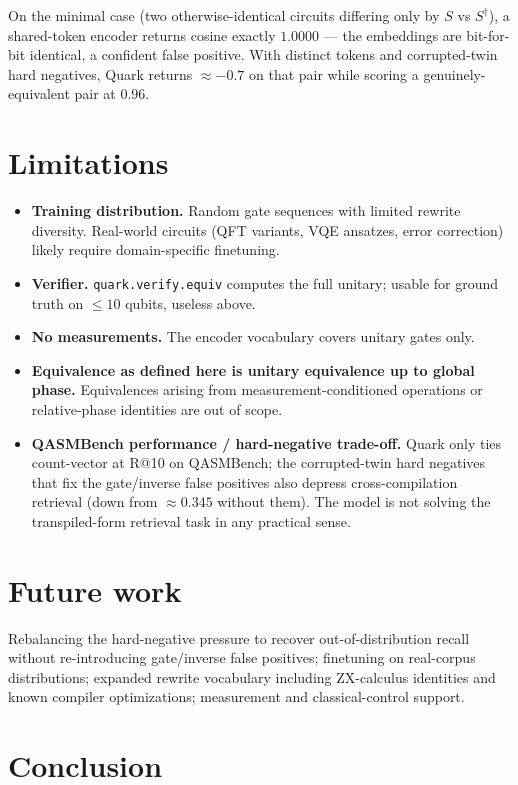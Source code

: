 \documentclass[11pt]{article}
\begin{document}
On the minimal case (two otherwise-identical circuits differing only by $S$ vs $S^\dagger$), a shared-token encoder returns cosine exactly $1.0000$ --- the embeddings are bit-for-bit identical, a confident false positive. With distinct tokens and corrupted-twin hard negatives, Quark returns $\approx -0.7$ on that pair while scoring a genuinely-equivalent pair at $0.96$.

\section{Limitations}

\begin{itemize}[topsep=2pt,itemsep=2pt]
    \item \textbf{Training distribution.} Random gate sequences with limited rewrite diversity. Real-world circuits (QFT variants, VQE ansatzes, error correction) likely require domain-specific finetuning.
    \item \textbf{Verifier.} \texttt{quark.verify.equiv} computes the full unitary; usable for ground truth on $\leq 10$ qubits, useless above.
    \item \textbf{No measurements.} The encoder vocabulary covers unitary gates only.
    \item \textbf{Equivalence as defined here is unitary equivalence up to global phase.} Equivalences arising from measurement-conditioned operations or relative-phase identities are out of scope.
    \item \textbf{QASMBench performance / hard-negative trade-off.} Quark only ties count-vector at R@10 on QASMBench; the corrupted-twin hard negatives that fix the gate/inverse false positives also depress cross-compilation retrieval (down from $\approx 0.345$ without them). The model is not solving the transpiled-form retrieval task in any practical sense.
\end{itemize}

\section{Future work}

Rebalancing the hard-negative pressure to recover out-of-distribution recall without re-introducing gate/inverse false positives; finetuning on real-corpus distributions; expanded rewrite vocabulary including ZX-calculus identities and known compiler optimizations; measurement and classical-control support.

\section{Conclusion}
\end{document}
